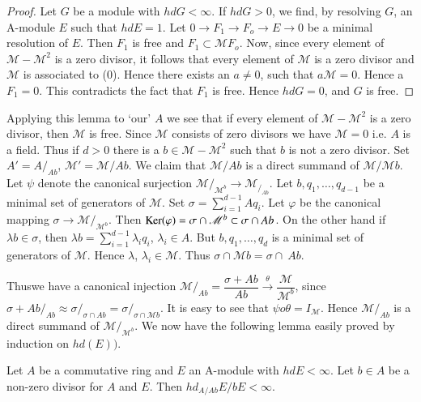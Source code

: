 \begin{proof}
Let $G$ be a module with $hd G < \infty$. If $hd G > 0$, we find, by
resolving $G$, an A-module $E$ such that $hd  E= 1$. Let $0 \rightarrow
F_1 \rightarrow F_o \rightarrow E \rightarrow 0$ be a minimal
resolution of $E$. Then $F_1$ is free and $F_1 \subset \mathscr{M} F_o$. Now,
since every element of $\mathscr{M} - \mathscr{M}^2$ is a zero
divisor, it follows that every element of $\mathscr{M}$ is a zero
divisor and $\mathscr{M}$ is associated to (0). Hence there exists
an $a \neq 0$, such that $a \mathscr{M} = 0$. Hence a $F_1 = 0$. This
contradicts the fact that $F_1$ is free. Hence $hd G = 0$, and $G$ is
free. 
\end{proof}
    
Applying this lemma to `our' $A$ we see that if every element of
$\mathscr{M} - \mathscr{M}^2$ is a zero divisor, then $\mathscr{M}$ is
free. Since $\mathscr{M}$ consists of  zero divisors we have
$\mathscr{M}= 0$ i.e. $A$ is a field. Thus if $d > 0$ there is a $b
\in \mathscr{M} - \mathscr{M}^2$ such that $b$ is not a zero
divisor. Set $A' = A/_{Ab}$, $\mathscr{M}' = \mathscr{M}/Ab$. We claim
that $\mathscr{M} / Ab$ is a direct summand of
$\mathscr{M}/\mathscr{M}b$. 
Let $\psi$ denote the canonical surjection
$\mathscr{M}/_{\mathscr{M}^b} \rightarrow
\mathscr{M}_{/_{Ab}}$. Let $b, q_1, \ldots , q_{d-1}$ be a minimal set
of generators of $\mathscr{M}$. Set $\sigma = \sum\limits_{i = 1}^{d -
  1} Aq_i$. Let $\varphi$ be the canonical mapping $\sigma \rightarrow
\mathscr{M}/_{\mathscr{M}^b}$. Then $\operatorname{Ker} (\varphi) = \sigma \cap
\mathscr{M}^b \subset \sigma \cap Ab$. On the other hand if $\lambda b
\in \sigma$, then $\lambda b = \sum\limits_{i = 1}^{d-1} \lambda_i
q_i$, $\lambda_i \in A$. But $b, q_1, \ldots , q_d$ is a minimal set of
generators of $\mathscr{M}$. Hence $\lambda$, $\lambda_i \in
\mathscr{M}$. Thus $\sigma \cap \mathscr{M} b = \sigma \cap ~ Ab$. 

Thus\pageoriginale we have a canonical injection $\mathscr{M}/_{Ab} =
\dfrac{\sigma  +  Ab}{Ab} \xrightarrow{\theta}
\dfrac{\mathscr{M}}{\mathscr{M}^b}$, since $\sigma + Ab/_{Ab} \approx
\sigma/_{\sigma \cap Ab}= \sigma/_{\sigma \cap
    \mathscr{M}b}$. It is easy to see that $\psi o \theta =
I_{\mathscr{M}}$. Hence $\mathscr{M}/_{Ab}$ is a direct summand of
$\mathscr{M}/_{\mathscr{M}^b}$. We now have the following lemma
easily proved by induction on $hd (E))$. 

\begin{lemma}%
Let $A$ be a commutative ring and $E$ an A-module with $hd E <
\infty$. Let $b \in A$ be a non-zero divisor for $A$ and $E$. Then
$hd_{A/{Ab}} E/{bE} < \infty$. 
\end{lemma}    

